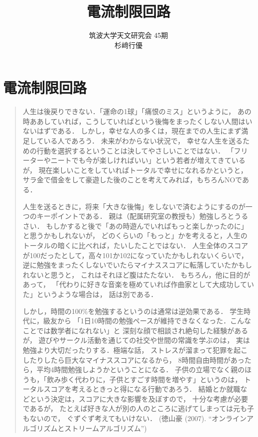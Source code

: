 \documentclass[uplatex,dvipdfmx,a4j,10pt]{jsarticle}
\title{電流制限回路}
\author{筑波大学天文研究会 45期 \\ 杉﨑行優}
\date{}
\begin{document}
\maketitle
\thispagestyle{plain}
\newpage
\tableofcontents
\listoffigures
\listoftables
\newpage

\section{電流制限回路}

\begin{quote}
  人生は後戻りできない．「運命の1球」「痛恨のミス」というように，
  あの時ああしていれば，こうしていればという後悔をまったくしない人間はいないはずである．
  しかし，幸せな人の多くは，現在までの人生にまず満足している人であろう．
  未来がわからない状況で，
  幸せな人生を送るための行動を選択するということは決してやさしいことではない．
  「フリーターやニートでも今が楽しければいい」という若者が増えてきているが，
  現在楽しいことをしていればトータルで幸せになれるかというと，
  サラ金で借金をして豪遊した後のことを考えてみれば，もちろんNOである．

  人生を送るときに，将来「大きな後悔」をしないで済むようにするのが一つのキーポイントである．
  親は（配属研究室の教授も）勉強しろとうるさい．
  もしかすると後で「あの時遊んでいればもっと楽しかったのに」と思うかもしれないが，
  どのくらいの「もっと」かを考えると，人生のトータルの暗くに比べれば，たいしたことではない．
  人生全体のスコアが100だったとして，高々101か102になっていたかもしれないくらいで，
  逆に勉強をまったくしないでいたらマイナススコアに転落していたかもしれないと思うと，
  これはそれほど腹はたたない．
  もちろん，他に目的があって，
  「代わりに好きな音楽を極めていれば作曲家として大成功していた」というような場合は，
  話は別である．

  しかし，時間の100\%を勉強するというのは通常は逆効果である．
  学生時代に，級友から
  「1日10時間の勉強ペースが維持できなくなった．こんなことでは数学者になれない」と
  深刻な顔で相談され絶句した経験があるが，
  遊びやサークル活動を通じての社交や世間の常識を学ぶのは，
  実は勉強より大切だったりする．極端な話，
  ストレスが溜まって犯罪を起こしたりしたら巨大なマイナススコアになるから，
  8時間自由時間があったら，平均4時間勉強しようかということになる．
  子供の立場でなく親のほうも，「飲み歩く代わりに，子供とすごす時間を増やす」というのは，
  トータルスコアを考えるときっと得になる行動であろう．
  結婚とか就職などという決定は，スコアに大きな影響を及ぼすので，
  十分な考慮が必要であるが，
  たとえば好きな人が別の人のところに逃げてしまっては元も子もないので，
  ぐずぐず考えてもいけない．
  \null\hfill(徳山豪 (2007). ``オンラインアルゴリズムとストリームアルゴリズム'')
\end{quote}
\end{document}
